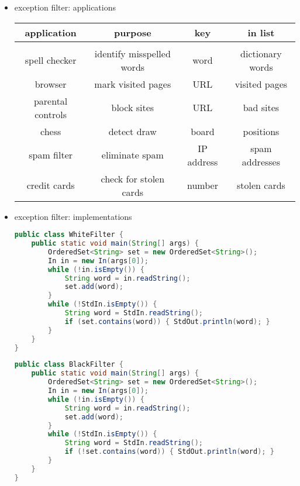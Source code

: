 \documentclass[8pt,a4paper,compress]{beamer}
\begin{document}
\begin{frame}[fragile]
\begin{itemize}
\item exception filter: applications
\begin{center}
\begin{tabular}{cccc}
\textbf{application} & \textbf{purpose} & \textbf{key} & \textbf{in list} \\ \hline \\
spell checker & identify misspelled words & word & dictionary words \\
browser & mark visited pages & URL & visited pages \\
parental controls & block sites & URL & bad sites \\
chess & detect draw & board & positions \\
spam filter & eliminate spam  & IP address & spam addresses \\
credit cards & check for stolen cards & number & stolen cards
\end{tabular} 
\end{center}
\end{itemize}
\end{frame}

\begin{frame}[fragile]
\begin{itemize}
\item exception filter: implementations
\begin{lstlisting}[language=Java]
public class WhiteFilter {  
    public static void main(String[] args) {
        OrderedSet<String> set = new OrderedSet<String>();
        In in = new In(args[0]);
        while (!in.isEmpty()) {
            String word = in.readString();
            set.add(word);
        }
        while (!StdIn.isEmpty()) {
            String word = StdIn.readString();
            if (set.contains(word)) { StdOut.println(word); }
        }
    }
}
\end{lstlisting}

\begin{lstlisting}[language=Java]
public class BlackFilter {  
    public static void main(String[] args) {
        OrderedSet<String> set = new OrderedSet<String>();
        In in = new In(args[0]);
        while (!in.isEmpty()) {
            String word = in.readString();
            set.add(word);
        }
        while (!StdIn.isEmpty()) {
            String word = StdIn.readString();
            if (!set.contains(word)) { StdOut.println(word); }
        }
    }
}
\end{lstlisting}
\end{itemize}
\end{frame}
\end{document}
